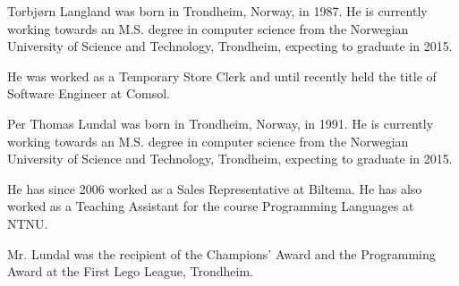\documentclass[a4paper]{IEEEtran}
\begin{document}
\begin{IEEEbiography}{Torbjørn Langland}
    was born in Trondheim, Norway, in 1987.
    He is currently working towards an M.S. degree in computer science from the Norwegian University of Science and Technology, Trondheim, expecting to graduate in 2015.

    He was worked as a Temporary Store Clerk and until recently held the title of Software Engineer at Comsol.

\end{IEEEbiography}

\begin{IEEEbiography}{Per Thomas Lundal}
    was born in Trondheim, Norway, in 1991.
    He is currently working towards an M.S. degree in computer science from the Norwegian University of Science and Technology, Trondheim, expecting to graduate in 2015.

    He has since 2006 worked as a Sales Representative at Biltema.
    He has also worked as a Teaching Assistant for the course Programming Languages at NTNU.

    Mr. Lundal was the recipient of the Champions' Award and the Programming Award at the First Lego League, Trondheim.
\end{IEEEbiography}
\end{document}
